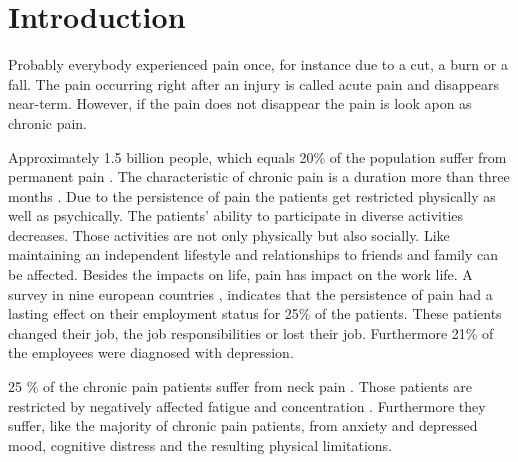 \chapter{Introduction}

Probably everybody experienced pain once, for instance due to a cut, a burn or a fall. The pain occurring right after an injury is called acute pain and disappears near-term. However, if the pain does not disappear the pain is look apon as chronic pain. \cite{Briggs2010,Mello2016}

Approximately 1.5 billion people, which equals 20\% of the population suffer from permanent pain \cite{Zeidan2016,Macfarlanea2016}. The characteristic of chronic pain is a duration more than three months \cite{Mello2016}. Due to the persistence of pain the patients get restricted physically as well as psychically. 
The patients' ability to participate in diverse activities decreases. Those activities are not only physically but also socially. Like maintaining an independent lifestyle and relationships to friends and family can be affected. Besides the impacts on life, pain has impact on the work life. A survey in nine european countries  , indicates that the persistence of pain had a lasting effect on their employment status for 25\% of the patients. These patients changed their job, the job responsibilities or lost their job. Furthermore  21\% of the employees were diagnosed with depression. \cite{Breivik2006} 



25 \% of the chronic pain patients suffer from neck pain \cite{Macfarlanea2016}. Those patients are restricted by negatively affected fatigue and concentration \cite{vanRanderaat2016}. Furthermore they suffer, like the majority of chronic pain patients, from anxiety and depressed mood, cognitive distress and the resulting physical limitations. \cite{gross2013}

